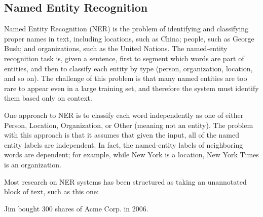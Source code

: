\documentclass[thesis=M,english]{FITthesis}[2018/05/30]
\begin{document}


\subsection{Named Entity Recognition}
Named Entity Recognition (NER) \cite{article:NER} is the problem of identifying and classifying proper names in text, including locations, such as China; people, such as George Bush; and organizations, such as the United Nations. The named-entity recognition task is, given a sentence, first to segment which words are part of entities, and then to classify each entity by type (person, organization, location, and so on). The challenge of this problem is that many named entities are too rare to appear even in a large training set, and therefore the system must identify them based only on context.

One approach to NER is to classify each word independently as one of either Person, Location, Organization, or Other (meaning not an entity). The problem with this approach is that it assumes that given the input, all of the named entity labels are independent. In fact, the named-entity labels of neighboring words are dependent; for example, while New York is a location, New York Times is an organization.



Most research on NER systems has been structured as taking an unannotated block of text, such as this one:

Jim bought 300 shares of Acme Corp. in 2006.
\end{document}
